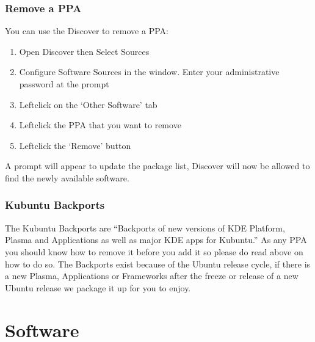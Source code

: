 \documentclass[letterpaper,10pt,english]{sphinxmanual}
\begin{document}
\subsection{Remove a PPA}
\label{\detokenize{docs/repositories:remove-a-ppa}}
\sphinxAtStartPar
You can use the Discover to remove a PPA:
\begin{enumerate}
%
\item {} 
\sphinxAtStartPar
Open Discover then Select Sources

\item {} 
\sphinxAtStartPar
Configure Software Sources in the window. Enter your administrative password at the prompt

\item {} 
\sphinxAtStartPar
Left\sphinxhyphen{}click on the ‘Other Software’ tab

\item {} 
\sphinxAtStartPar
Left\sphinxhyphen{}click the PPA that you want to remove

\item {} 
\sphinxAtStartPar
Left\sphinxhyphen{}click the ‘Remove’ button

\end{enumerate}

\sphinxAtStartPar
A prompt will appear to update the package list, Discover will now be allowed to find the newly available software.


\subsection{Kubuntu Backports}
\label{\detokenize{docs/repositories:kubuntu-backports}}
\sphinxAtStartPar
The Kubuntu Backports are “Backports of new versions of KDE Platform, Plasma and Applications as well as major KDE apps for Kubuntu.” As any PPA you should know how to remove it before you add it so please do read above on how to do so. The Backports exist because of the Ubuntu release cycle, if there is a new Plasma, Applications or Frameworks after the freeze or release of a new Ubuntu release we package it up for you to enjoy.

\sphinxAtStartPar
{}


\chapter{Software}
\label{\detokenize{docs/software:software}}\label{\detokenize{docs/software:software-link}}\label{\detokenize{docs/software::doc}}
\end{document}
